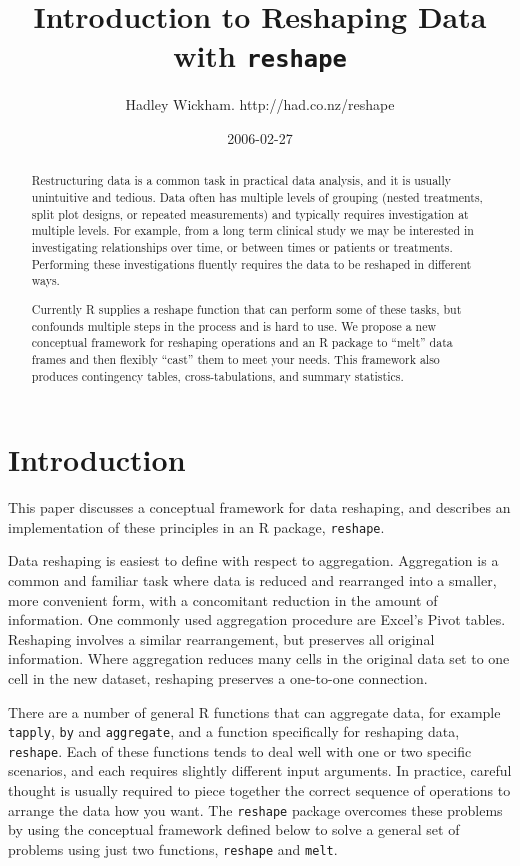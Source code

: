 \documentclass[]{article}
\title{Introduction to Reshaping Data with \texttt{reshape}}
\author{Hadley Wickham. http://had.co.nz/reshape}
\date{2006-02-27}
\begin{document}
\maketitle

\begin{abstract}

Restructuring data is a common task in practical data analysis, and it is usually unintuitive and tedious. Data often has multiple levels of grouping (nested treatments, split plot designs, or repeated measurements) and typically requires investigation at multiple levels. For example, from a long term clinical study we may be interested in investigating relationships over time, or between times or patients or treatments.  Performing these investigations fluently requires the data to be reshaped in different ways.

Currently R supplies a reshape function that can perform some of these tasks, but confounds multiple steps in the process and is hard to use.  We propose a new conceptual framework for reshaping operations and an R package to ``melt'' data frames and then flexibly ``cast'' them to meet your needs. This framework also produces contingency tables, cross-tabulations, and summary statistics.

\end{abstract}

\section{Introduction}

This paper discusses a conceptual framework for data reshaping, and describes an implementation of these principles in an R package, \texttt{reshape}.  

Data reshaping is easiest to define with respect to aggregation.  Aggregation is a common and familiar task where data is reduced and rearranged into a smaller, more convenient form, with a concomitant reduction in the amount of information.  One commonly used aggregation procedure are Excel's Pivot tables.  Reshaping involves a similar rearrangement, but preserves all original information.  Where aggregation reduces many cells in the original data set to one cell in the new dataset, reshaping preserves a one-to-one connection.  

There are a number of general R functions that can aggregate data, for example \texttt{tapply}, \texttt{by} and \texttt{aggregate}, and a function specifically for reshaping data, \texttt{reshape}.  Each of these functions tends to deal well with one or two specific scenarios, and each requires slightly different input arguments.  In practice, careful thought is usually required to piece together the correct sequence of operations to arrange the data how you want.  The \texttt{reshape} package overcomes these problems by using the conceptual framework defined below to solve a general set of problems using just two functions, \texttt{reshape} and \texttt{melt}.  
\end{document}
